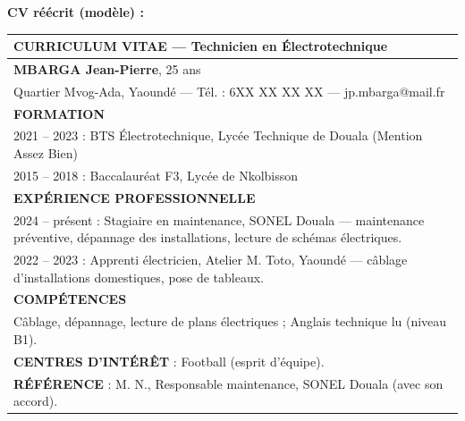\documentclass[11pt]{article}
\begin{document}
\begin{corrige}
\textbf{CV réécrit (modèle) :}
\begin{center}
\begin{tabularx}{\linewidth}{|X|}
\hline
\textbf{CURRICULUM VITAE — Technicien en Électrotechnique} \\
\hline
\textbf{MBARGA Jean-Pierre}, 25 ans \\
Quartier Mvog-Ada, Yaoundé — Tél. : 6XX XX XX XX — jp.mbarga@mail.fr \\
\hline
\textbf{FORMATION} \\
2021 -- 2023 : BTS Électrotechnique, Lycée Technique de Douala (Mention Assez Bien) \\
2015 -- 2018 : Baccalauréat F3, Lycée de Nkolbisson \\
\hline
\textbf{EXPÉRIENCE PROFESSIONNELLE} \\
2024 -- présent : Stagiaire en maintenance, SONEL Douala — maintenance préventive, dépannage des installations, lecture de schémas électriques. \\
2022 -- 2023 : Apprenti électricien, Atelier M. Toto, Yaoundé — câblage d'installations domestiques, pose de tableaux. \\
\hline
\textbf{COMPÉTENCES} \\
Câblage, dépannage, lecture de plans électriques ; Anglais technique lu (niveau B1). \\
\textbf{CENTRES D'INTÉRÊT} : Football (esprit d'équipe). \\
\textbf{RÉFÉRENCE} : M. N., Responsable maintenance, SONEL Douala (avec son accord). \\
\hline
\end{tabularx}
\end{center}
\end{corrige}
\end{document}
